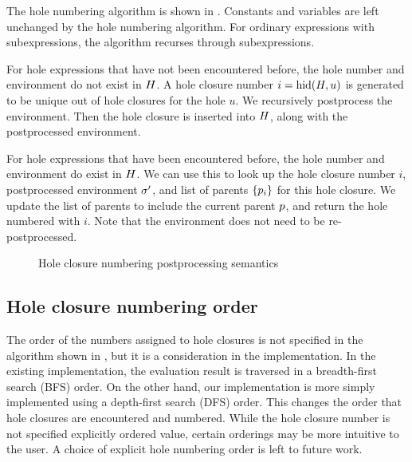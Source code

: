 The hole numbering algorithm is shown in . Constants and variables are left unchanged by the hole numbering algorithm. For ordinary expressions with subexpressions, the algorithm recurses through subexpressions.

For hole expressions that have not been encountered before, the hole number and environment do not exist in $H$. A hole closure number $i=\operatorname{hid}(H,u)$ is generated to be unique out of hole closures for the hole $u$. We recursively postprocess the environment. Then the hole closure is inserted into $H$, along with the postprocessed environment.

For hole expressions that have been encountered before, the hole number and environment do exist in $H$. We can use this to look up the hole closure number $i$, postprocessed environment $\sigma'$, and list of parents $\{p_i\}$ for this hole closure. We update the list of parents to include the current parent $p$, and return the hole numbered with $i$. Note that the environment does not need to be re-postprocessed.

\begin{figure}
  \centering
  \begin{mdframed}
    \begin{singlespace}
      
    \end{singlespace}
  \end{mdframed}
  \caption{Hole closure numbering postprocessing semantics}
  \label{fig:big-step-renumber-new-rules}
\end{figure}

\subsection{Hole closure numbering order}
\label{sec:numbering-order}

The order of the numbers assigned to hole closures is not specified in the algorithm shown in , but it is a consideration in the implementation. In the existing implementation, the evaluation result is traversed in a breadth-first search (BFS) order. On the other hand, our implementation is more simply implemented using a depth-first search (DFS) order. This changes the order that hole closures are encountered and numbered. While the hole closure number is not specified explicitly ordered value, certain orderings may be more intuitive to the user. A choice of explicit hole numbering order is left to future work.

